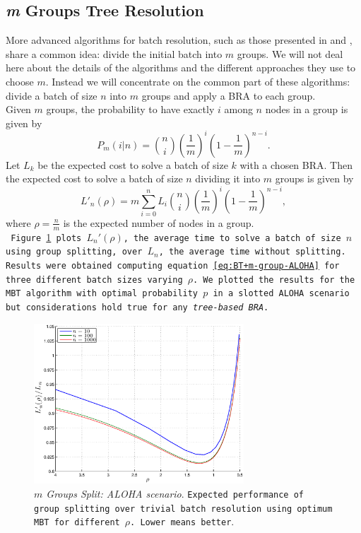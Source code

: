 \documentclass[11pt,a4paper,twoside,openright]{book}
\newcommand{\revv}[1]{{\tt#1}}
\begin{document}
\subsection{\emph{m} Groups Tree Resolution}
\label{se:mgroups}

More advanced algorithms for batch resolution, such as those presented in \cite{cidon} and \cite{greenberg87}, share a common idea: divide the initial batch into $m$ groups. We will not deal here about the details of the algorithms and the different approaches  they use to choose $m$. Instead we will concentrate on the common part of these algorithms: divide a batch of size $n$ into $m$ groups and apply a BRA to each group.\\
Given $m$ groups, the probability to have exactly $i$ among $n$ nodes in a group is given by
\begin{equation}
P_{m}(i|n)={n \choose i} \left(\frac{1}{m}\right)^{i} \left(1-\frac{1}{m}\right)^{n-i}.
\end{equation}
Let $L_{k}$ be the expected cost to solve a batch of size $k$ with a chosen BRA. Then the expected cost to solve a batch of size $n$ dividing it into $m$ groups is given by
\begin{equation}
\label{eq:BT+m-group-ALOHA}
L'_{n}(\rho)=m \sum_{i=0}^{n}L_{i}{n \choose i} \left(\frac{1}{m}\right)^{i} \left(1-\frac{1}{m}\right)^{n-i},
\end{equation}
where $\rho={\displaystyle\frac{n}{m}}$ is the expected number of nodes in a group.\\
\revv{
Figure \ref{m-groups-MBT-ALOHA} plots $L_{n}'(\rho)$, the average time to solve a batch of size $n$ using group splitting, over $L_{n}$, the average time   without splitting. Results were obtained computing  equation \eqref{eq:BT+m-group-ALOHA} for three different batch sizes varying $\rho$.  We plotted the results for the MBT algorithm with optimal probability $p$ in a slotted ALOHA scenario but considerations hold true for any \emph{tree-based BRA}.}


\begin{figure}[H]
\begin{center}
\includegraphics[width=0.7\textwidth]{matlab/BTs/m-groups-MBT-ALOHA}
\caption[$m$ Groups Split: ALOHA scenario]{\emph{$m$ Groups Split: ALOHA scenario}. \revv{Expected performance of group splitting over trivial batch resolution using optimum MBT for different $\rho$. Lower means better}.}
\label{m-groups-MBT-ALOHA}
\end{center}
\end{figure}
\end{document}
